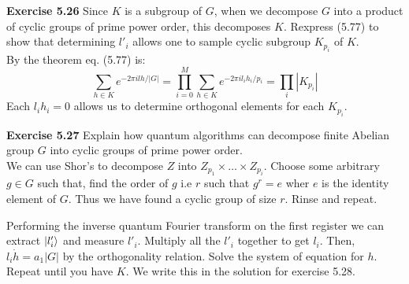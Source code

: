 \documentclass{article}
\begin{document}
\begin{tcolorbox}\textbf{Exercise 5.26} Since $K$ is a subgroup of $G$, when we decompose $G$ into a product of cyclic groups of prime power order, this decomposes $K$. Rexpress (5.77) to show that determining $l'_i$ allows one to sample cyclic subgroup $K_{p_i}$ of $K$.\\

By the theorem eq. (5.77) is:
$$\sum_{h\in K} e^{-2\pi i lh /|G|} = \prod_{i=0}^M \sum_{h\in K} e^{-2\pi il_i h_i/ p_i} = \prod_i |K_{p_i}|$$
Each $l_i h_i = 0$ allows us to determine orthogonal elements for each $K_{p_i}$. 


\end{tcolorbox}
\begin{tcolorbox}\textbf{Exercise 5.27} Explain how quantum algorithms can decompose finite Abelian group $G$ into cyclic groups of prime power order.\\
	We can use Shor's to decompose $Z$ into $Z_{p_1} \times \dots \times Z_{p_i}$. Choose some arbitrary $g\in G$ such that, find the order of $g$ i.e $r$ such that $g^r  = e$ wher $e$ is the identity element of $G$. Thus we have found a cyclic group of size $r$. Rinse and repeat.
\end{tcolorbox}
Performing the inverse quantum Fourier transform on the first register we can extract $\ket{l'_{i}}$ and measure $l'_i$. Multiply all the $l'_i$ together to get $l_i$. Then, $l_i \dot h = a_1 |G|$ by the orthogonality relation. Solve the system of equation for $h$. Repeat until you have $K$. We write this in the solution for exercise 5.28.
\end{document}

